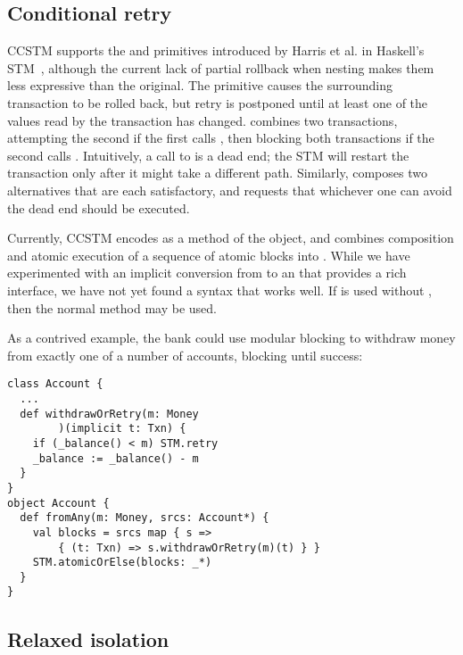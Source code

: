 \subsection{Conditional retry}

CCSTM supports the  and  primitives introduced by
Harris et al. in Haskell's STM~\cite{harris05ctm}, although the current
lack of partial rollback when nesting makes them less expressive than the original.
The  primitive causes the surrounding transaction to be rolled
back, but retry is postponed until at least one of the values read by
the transaction has changed.   combines two transactions,
attempting the second if the first calls , then blocking
both transactions if the second calls .  Intuitively, a call
to  is a dead end; the STM will restart the transaction
only after it might take a different path.  Similarly, 
composes two alternatives that are each satisfactory, and requests that
whichever one can avoid the dead end should be executed.

Currently, CCSTM encodes  as a method of the  object, and 
combines composition and atomic execution of a sequence of atomic blocks into
\code{STM.atomicOrElse[}\code{](blocks: (}\code{ => }\code{)*): }.
While we have experimented with an implicit conversion from 
\code{ => } to an  that provides a
rich interface, we have not yet found a syntax that works well.  If
 is used without , then the normal 
method may be used.

As a contrived example,
the bank could use modular blocking to withdraw money from exactly one of a number of
accounts, blocking until success:
\lstset{numbers=none}
\begin{lstlisting}
class Account {
  ...
  def withdrawOrRetry(m: Money
        )(implicit t: Txn) {
    if (_balance() < m) STM.retry
    _balance := _balance() - m
  }
}
object Account {
  def fromAny(m: Money, srcs: Account*) {
    val blocks = srcs map { s =>
        { (t: Txn) => s.withdrawOrRetry(m)(t) } }
    STM.atomicOrElse(blocks: _*)
  }
}
\end{lstlisting}
\lstset{numbers=left}


\subsection{Relaxed isolation}
\label{sec:unrecordedread}

